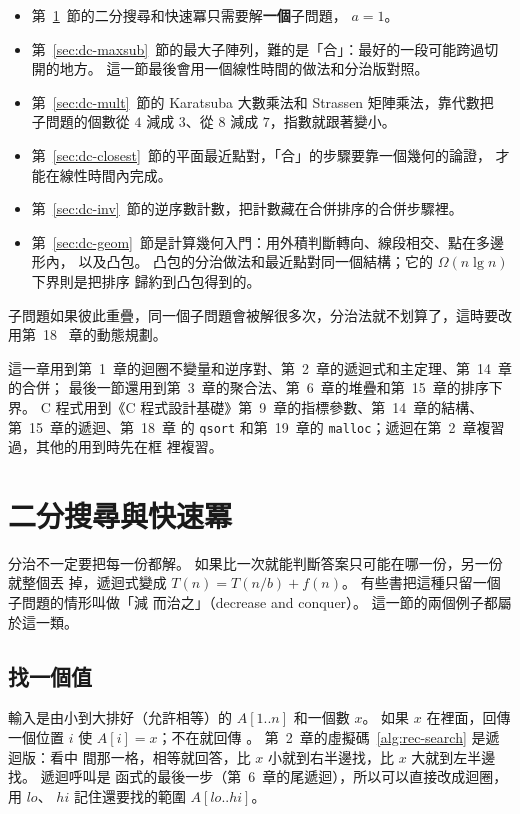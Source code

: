 \begin{itemize}
\item 第~\ref{sec:dc-bsearch}~節的二分搜尋和快速冪只需要解\textbf{一個}子問題，
$a = 1$。
\item 第~\ref{sec:dc-maxsub}~節的最大子陣列，難的是「合」：最好的一段可能跨過切
開的地方。 這一節最後會用一個線性時間的做法和分治版對照。
\item 第~\ref{sec:dc-mult}~節的 Karatsuba 大數乘法和 Strassen 矩陣乘法，靠代數把
子問題的個數從 $4$ 減成 $3$、從 $8$ 減成 $7$，指數就跟著變小。
\item 第~\ref{sec:dc-closest}~節的平面最近點對，「合」的步驟要靠一個幾何的論證，
才能在線性時間內完成。
\item 第~\ref{sec:dc-inv}~節的逆序數計數，把計數藏在合併排序的合併步驟裡。
\item 第~\ref{sec:dc-geom}~節是計算幾何入門：用外積判斷轉向、線段相交、點在多邊形內，
以及凸包。 凸包的分治做法和最近點對同一個結構；它的 $\Omega(n \lg n)$ 下界則是把排序
歸約到凸包得到的。
\end{itemize}

子問題如果彼此重疊，同一個子問題會被解很多次，分治法就不划算了，這時要改用第~18~
章的動態規劃。

這一章用到第~1~章的迴圈不變量和逆序對、第~2~章的遞迴式和主定理、第~14~章的合併；
最後一節還用到第~3~章的聚合法、第~6~章的堆疊和第~15~章的排序下界。
C 程式用到《C 程式設計基礎》第~9~章的指標參數、第~14~章的結構、第~15~章的遞迴、第~18~章
的 \texttt{qsort} 和第~19~章的 \texttt{malloc}；遞迴在第~2~章複習過，其他的用到時先在框
裡複習。

\section{二分搜尋與快速冪}
\label{sec:dc-bsearch}

分治不一定要把每一份都解。 如果比一次就能判斷答案只可能在哪一份，另一份就整個丟
掉，遞迴式變成 $T(n) = T(n/b) + f(n)$。 有些書把這種只留一個子問題的情形叫做「減
而治之」（decrease and conquer）。 這一節的兩個例子都屬於這一類。

\subsection{找一個值}

輸入是由小到大排好（允許相等）的 $A[1..n]$ 和一個數 $x$。 如果 $x$ 在裡面，回傳
一個位置 $i$ 使 $A[i] = x$；不在就回傳 \NIL。 第~2~章的虛擬碼~\ref{alg:rec-search} 是遞迴版：看中
間那一格，相等就回答，比 $x$ 小就到右半邊找，比 $x$ 大就到左半邊找。 遞迴呼叫是
函式的最後一步（第~6~章的尾遞迴），所以可以直接改成迴圈，用 $\mathit{lo}$、
$\mathit{hi}$ 記住還要找的範圍 $A[\mathit{lo}..\mathit{hi}]$。

